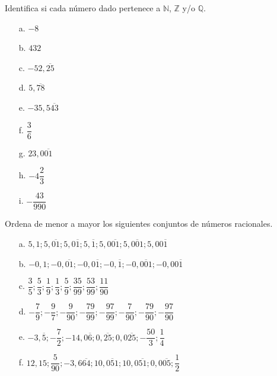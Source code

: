 \documentclass[spanish,letterpaper, 11pt, addpoints, answers]{exam}
\begin{document}
\begin{questions}

  \question Identifica si cada número dado pertenece a $\mathbb{N}$, $\mathbb{Z}$ y/o $\mathbb{Q}$.
  \begin{multicols}{4}

    \begin{itemize}
      \item[a.] $-8$
      \item[b.] $432$
      \item[c.] $-52{,}\overline{25}$
      \item[d.] $5,\overline{78}$
      \item[e.] $-35,5\overline{43}$
      \item[f.] $\dfrac{3}{6}$
      \item[g.] $23{,}0\overline{01}$
      \item[h.] $-4\dfrac{2}{3}$
      \item[i.] $-\dfrac{43}{990}$
    \end{itemize}
  \end{multicols}

  \question Ordena de menor a mayor los siguientes conjuntos de números racionales.
  \begin{multicols}{2}


    \begin{itemize}
      \item[a.] $5{,}1;5{,}\overline{01};5{,}0\overline{1};5{,}\overline{1};5{,}0\overline{01};5{,}\overline{001};5{,}00\overline{1}$
      \item[b.] $-0{,}1;-0{,}\overline{01};-0{,}0\overline{1};-0{,}\overline{1};-0{,}\overline{001};-0{,}00\overline{1}$
      \item[c.] $\dfrac{3}{5};\dfrac{5}{3};\dfrac{1}{9};\dfrac{1}{3};\dfrac{5}{9};\dfrac{35}{99};\dfrac{53}{99};\dfrac{11}{90}$
      \item[d.] $-\dfrac{7}{9};-\dfrac{9}{7};-\dfrac{9}{90};-\dfrac{79}{99};-\dfrac{97}{99};-\dfrac{7}{90};-\dfrac{79}{90};-\dfrac{97}{90}$
      \item[e.] $-3{,}\overline{5};-\dfrac{7}{2};-14{,}0\overline{6};0{,}\overline{25};0{,}0\overline{25};-\dfrac{50}{3};\dfrac{1}{4}$
      \item[f.] $12{,}15;\dfrac{5}{90};-3{,}6\overline{64};10{,}\overline{051};10{,}0\overline{51};0{,}0\overline{05};\dfrac{1}{2}$
    \end{itemize}
  \end{multicols}


\end{questions}
\end{document}
